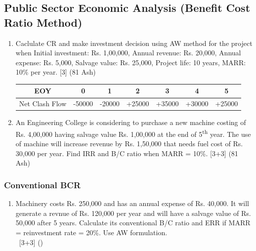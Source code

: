 \documentclass[12pt]{article}
\newcommand{\enter}{\\\textcolor{white}{1}}
\newcommand{\super}[1]{\textsuperscript{#1}}
\begin{document}
	\subsection{Public Sector Economic Analysis (Benefit Cost Ratio Method)}
		\begin{enumerate}
			\item Caclulate CR and make investment decision using AW method for the project when Initial investment: Rs. 1,00,000, Annual revenue: Rs. 20,000, Annual expense: Rs. 5,000, Salvage value: Rs. 25,000, Project life: 10 years, MARR: 10\% per year. \hfill [3] (81 Ash)\\
				\begin{tabular}{|c|c|c|c|c|c|c|}
					\hline
					EOY & 0 & 1 & 2 & 3 & 4 & 5\\ \hline
					Net Clash Flow & -50000 & -20000 & +25000 & +35000 & +30000 & +25000\\ 
					\hline
				\end{tabular}
			
			\item An Engineering College is considering to purchase a new machine costing of Rs. 4,00,000 having salvage value Rs. 1,00,000 at the end of 5\super{th} year. The use of machine will increase revenue by Rs. 1,50,000 that needs fuel cost of Rs. 30,000 per year. Find IRR and B/C ratio when MARR = 10\%. \hfill [3+3] (81 Ash)
		\end{enumerate}

		\subsubsection{Conventional BCR}
			\begin{enumerate}[noitemsep, topsep=0pt]
				\item Machinery costs Rs. 250,000 and has an annual expense of Rs. 40,000. It will generate a revnue of Rs. 120,000 per year and will have a salvage value of Rs. 50,000 after 5 years. Calculate its conventional B/C ratio and ERR if MARR = reinvestment rate = 20\%. Use AW formulation. \enter\hfill [3+3] ()
			\end{enumerate}
\end{document}
